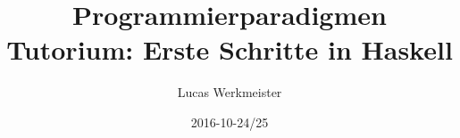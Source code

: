 \documentclass{beamer}
\title[\tiny \copyright 2013 by IPD Snelting -- Programmierparadigmen]{Programmierparadigmen \\ Tutorium: Erste Schritte in Haskell}
\author{Lucas Werkmeister}
\date{2016-10-24/25}
\begin{document}
\normalsize
\normalem

\begin{frame}[plain]
  \titlepage
\end{frame}
\end{document}
